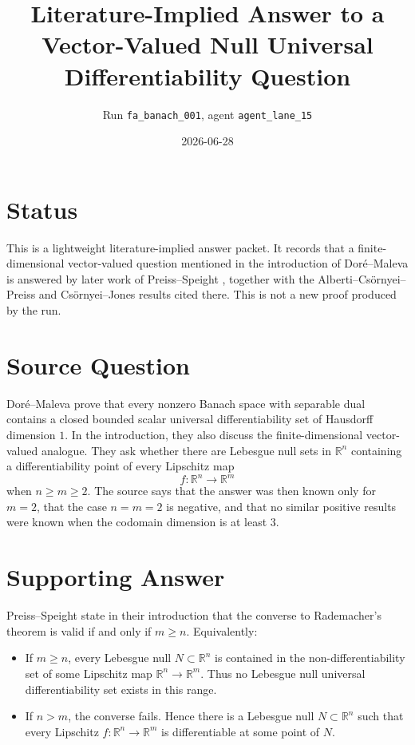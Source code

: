 \documentclass[11pt]{article}
\title{Literature-Implied Answer to a Vector-Valued Null Universal Differentiability Question}
\author{Run \texttt{fa\_banach\_001}, agent \texttt{agent\_lane\_15}}
\date{2026-06-28}
\newcommand{\R}{\mathbb R}
\begin{document}
\maketitle

\section*{Status}

This is a lightweight literature-implied answer packet.  It records that a
finite-dimensional vector-valued question mentioned in the introduction of
Doré--Maleva \cite{DM2011} is answered by later work of Preiss--Speight
\cite{PS2014}, together with the Alberti--Csörnyei--Preiss and
Csörnyei--Jones results cited there.  This is not a new proof produced by the
run.

\section*{Source Question}

Doré--Maleva \cite{DM2011} prove that every nonzero Banach space with
separable dual contains a closed bounded scalar universal differentiability set
of Hausdorff dimension \(1\).  In the introduction, they also discuss the
finite-dimensional vector-valued analogue.  They ask whether there are
Lebesgue null sets in \(\R^n\) containing a differentiability point of every
Lipschitz map
\[
  f:\R^n\to\R^m
\]
when \(n\ge m\ge2\).  The source says that the answer was then known only for
\(m=2\), that the case \(n=m=2\) is negative, and that no similar positive
results were known when the codomain dimension is at least \(3\).

\section*{Supporting Answer}

Preiss--Speight \cite{PS2014} state in their introduction that the converse to
Rademacher's theorem is valid if and only if \(m\ge n\).  Equivalently:

\begin{itemize}
\item If \(m\ge n\), every Lebesgue null \(N\subset\R^n\) is contained in the
non-differentiability set of some Lipschitz map \(\R^n\to\R^m\).  Thus no
Lebesgue null universal differentiability set exists in this range.
\item If \(n>m\), the converse fails.  Hence there is a Lebesgue null
\(N\subset\R^n\) such that every Lipschitz \(f:\R^n\to\R^m\) is differentiable
at some point of \(N\).
\end{itemize}
\end{document}
